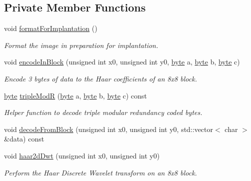 \subsection*{Private Member Functions}
\begin{DoxyCompactItemize}
\item 
void \hyperlink{classefb_1_1HaarConduitImage_a81e5b4f5db557a4899d4ae07c1e1b4d7}{formatForImplantation} ()
\begin{DoxyCompactList}\small\item\em Format the image in preparation for implantation. \item\end{DoxyCompactList}\item 
void \hyperlink{classefb_1_1HaarConduitImage_a7f72437165a2c5d3dd0bda166c281cf1}{encodeInBlock} (unsigned int x0, unsigned int y0, \hyperlink{namespaceefb_a0c8186d9b9b7880309c27230bbb5e69d}{byte} a, \hyperlink{namespaceefb_a0c8186d9b9b7880309c27230bbb5e69d}{byte} b, \hyperlink{namespaceefb_a0c8186d9b9b7880309c27230bbb5e69d}{byte} c)
\begin{DoxyCompactList}\small\item\em Encode 3 bytes of data to the Haar coefficients of an 8x8 block. \item\end{DoxyCompactList}\item 
\hyperlink{namespaceefb_a0c8186d9b9b7880309c27230bbb5e69d}{byte} \hyperlink{classefb_1_1HaarConduitImage_aec2f90bd4eefb8ed4c7efe0bf2ffcf11}{tripleModR} (\hyperlink{namespaceefb_a0c8186d9b9b7880309c27230bbb5e69d}{byte} a, \hyperlink{namespaceefb_a0c8186d9b9b7880309c27230bbb5e69d}{byte} b, \hyperlink{namespaceefb_a0c8186d9b9b7880309c27230bbb5e69d}{byte} c) const 
\begin{DoxyCompactList}\small\item\em Helper function to decode triple modular redundancy coded bytes. \item\end{DoxyCompactList}\item 
void \hyperlink{classefb_1_1HaarConduitImage_a06964ac33b5eda29247dfd8759f8829e}{decodeFromBlock} (unsigned int x0, unsigned int y0, std::vector$<$ char $>$ \&data) const 
\item 
void \hyperlink{classefb_1_1HaarConduitImage_a875768da357b56e18091f3b7a1d4057b}{haar2dDwt} (unsigned int x0, unsigned int y0)
\begin{DoxyCompactList}\small\item\em Perform the Haar Discrete Wavelet transform on an 8x8 block. \item\end{DoxyCompactList}\item 

\end{DoxyCompactItemize}
